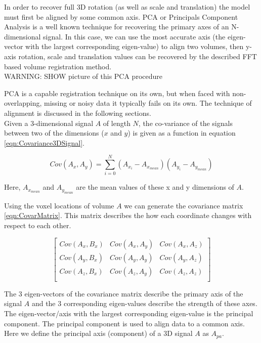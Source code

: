 In order to recover full 3D rotation (as well as scale and translation) the model must first be aligned by some common axis. PCA or Principals Component Analysis is a well known technique for recovering the primary axes of an N-dimensional signal. In this case, we can use the most accurate axis (the eigen-vector with the largest corresponding eigen-value) to align two volumes, then y-axis rotation, scale and translation values can be recovered by the described FFT based volume registration method. \\

WARNING: SHOW picture of this PCA procedure

PCA is a capable registration technique on its own, but when faced with non-overlapping, missing or noisy data it typically fails on its own. The technique of alignment is discussed in the following sections. \\

Given a 3-dimensional signal $A$ of length $N$, the co-variance of the signals between two of the dimensions ($x$ and $y$) is given as a function in equation \ref{eqn:Covariance3DSignal}.

\begin{equation} \label{eqn:Covariance3DSignal}
Cov(A_x,A_y) = \sum_{i=0}^{N}(A_{x_i} - A_{x_{mean}})(A_{y_i} - A_{y_{mean}})
\end{equation}

Here, $A_{x_{mean}}$ and $A_{y_{mean}}$ are the mean values of these x and y dimensions of $A$. 

Using the voxel locations of volume $A$ we can generate the covariance matrix \ref{eqn:CovarMatrix}. This matrix describes the how each coordinate changes with respect to each other.

\begin{equation} \label{eqn:CovarMatrix}
\left[
\begin{array}{ccc}
Cov(A_x, B_x) & Cov(A_x, A_y) & Cov(A_x, A_z) \\
Cov(A_y, B_x) & Cov(A_y, A_y) & Cov(A_y, A_z) \\
Cov(A_z, B_x) & Cov(A_z, A_y) & Cov(A_z, A_z) \\
\end{array}
\right]
\end{equation}

The 3 eigen-vectors of the covariance matrix describe the primary axis of the signal $A$ and the 3 corresponding eigen-values describe the strength of these axes. The eigen-vector/axis with the largest corresponding eigen-value is the principal component. The principal component is used to align data to a common axis. Here we define the principal axis (component) of a 3D signal $A$ as $A_{pa}$. \\

